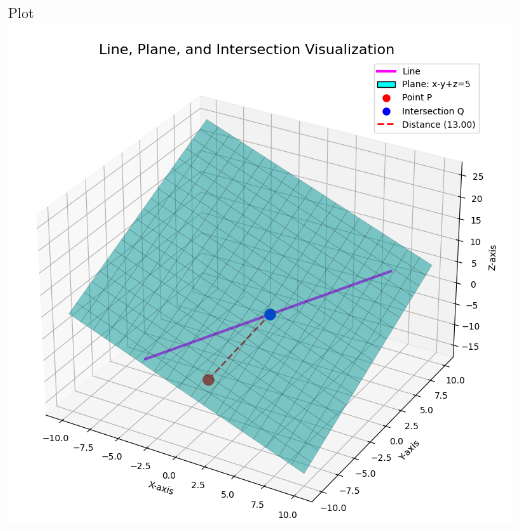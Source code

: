 \documentclass{beamer}
\begin{document}
\begin{frame}{Plot}
    \centering
    \includegraphics[width=\columnwidth, height=0.8\textheight, keepaspectratio]{figs/fig1.png} 
\end{frame}
\end{document}
